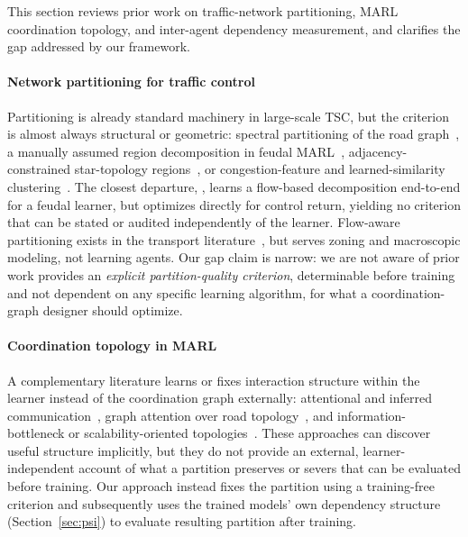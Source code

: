\documentclass[journal]{IEEEtran}
\theoremstyle{definition}
\begin{document}
This section reviews prior work on traffic-network partitioning, MARL coordination topology, and inter-agent dependency measurement, and clarifies the gap addressed by our framework.

\paragraph{Network partitioning for traffic control}
Partitioning is already standard machinery in large-scale TSC, but the criterion is almost always structural or geometric: spectral partitioning of the road graph~\citep{laplacian2009ieee}, a manually assumed region decomposition in feudal MARL~\citep{ma2020fma2c}, adjacency-constrained star-topology regions~\citep{regionlight2024}, or congestion-feature and learned-similarity clustering~\citep{communitydetection2021plosone,liu2023gplight}. The closest departure, \citet{ma2022feudal}, learns a flow-based decomposition end-to-end for a feudal learner, but optimizes directly for control return, yielding no criterion that can be stated or audited independently of the learner. Flow-aware partitioning exists in the transport literature~\citep{odflow2019partition,mfdpartition2020}, but serves zoning and macroscopic modeling, not learning agents. Our gap claim is narrow: we are not aware of prior work provides an \emph{explicit partition-quality criterion}, determinable before training and not dependent on any specific learning algorithm, for what a coordination-graph designer should optimize.

\paragraph{Coordination topology in MARL}
A complementary literature learns or fixes interaction structure within the learner instead of the coordination graph externally: attentional and inferred communication~\citep{jiang2018atoc,i2c2021,peng2020structured,aamas2021correlated}, graph attention over road topology~\citep{wei2019colight}, and information-bottleneck or scalability-oriented topologies~\citep{hetib2025,sun2026ibvq,wang2020imac,expocomm2025,li2025topology,zhu2026halo}. These approaches can discover useful structure implicitly, but they do not provide an external, learner-independent account of what a partition preserves or severs that can be evaluated before training. Our approach instead fixes the partition using a training-free criterion and subsequently uses the trained models' own dependency structure (Section~\ref{sec:psi}) to evaluate resulting partition after training.
\end{document}

